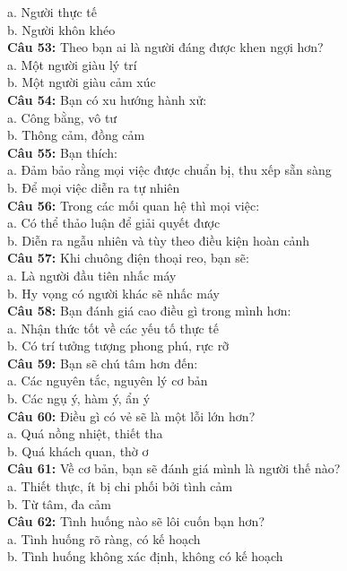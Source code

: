 \begin{multicols}{2}
a. Người thực tế \\
b. Người khôn khéo \\
\textbf{Câu 53:} Theo bạn ai là người đáng được khen ngợi hơn? \\
a. Một người giàu lý trí \\
b. Một người giàu cảm xúc \\
\textbf{Câu 54:} Bạn có xu hướng hành xử: \\
a. Công bằng, vô tư \\
b. Thông cảm, đồng cảm \\
\textbf{Câu 55:} Bạn thích: \\
a. Đảm bảo rằng mọi việc được chuẩn bị, thu xếp sẵn sàng \\
b. Để mọi việc diễn ra tự nhiên \\
\textbf{Câu 56:} Trong các mối quan hệ thì mọi việc: \\
a. Có thể thảo luận để giải quyết được \\
b. Diễn ra ngẫu nhiên và tùy theo điều kiện hoàn cảnh \\
\textbf{Câu 57:} Khi chuông điện thoại reo, bạn sẽ: \\
a. Là người đầu tiên nhấc máy \\
b. Hy vọng có người khác sẽ nhấc máy \\
\textbf{Câu 58:} Bạn đánh giá cao điều gì trong mình hơn: \\
a. Nhận thức tốt về các yếu tố thực tế \\
b. Có trí tưởng tượng phong phú, rực rỡ \\
\textbf{Câu 59:} Bạn sẽ chú tâm hơn đến: \\
a. Các nguyên tắc, nguyên lý cơ bản \\
b. Các ngụ ý, hàm ý, ẩn ý \\
\textbf{Câu 60:} Điều gì có vẻ sẽ là một lỗi lớn hơn? \\
a. Quá nồng nhiệt, thiết tha \\
b. Quá khách quan, thờ ơ \\
\textbf{Câu 61:} Về cơ bản, bạn sẽ đánh giá mình là người thế nào? \\
a. Thiết thực, ít bị chi phối bởi tình cảm \\
b. Từ tâm, đa cảm \\
\textbf{Câu 62:} Tình huống nào sẽ lôi cuốn bạn hơn? \\
a. Tình huống rõ ràng, có kế hoạch \\
b. Tình huống không xác định, không có kế hoạch \\

\end{multicols}

